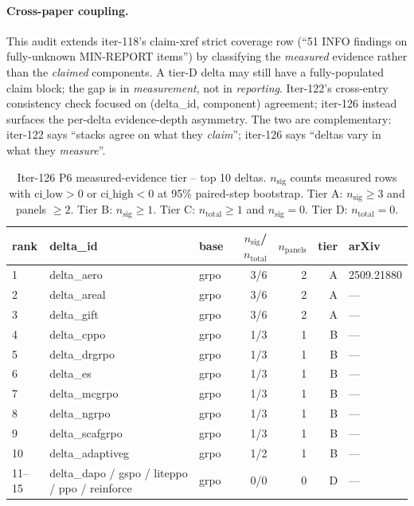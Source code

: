 \paragraph{Cross-paper coupling.}
This audit extends iter-118's claim-xref strict coverage row
(``51 INFO findings on fully-unknown MIN-REPORT items'') by classifying
the \emph{measured} evidence rather than the \emph{claimed} components.
A tier-D delta may still have a fully-populated claim block; the gap is
in \emph{measurement}, not in \emph{reporting}.  Iter-122's
cross-entry consistency check focused on (delta\_id, component)
agreement; iter-126 instead surfaces the per-delta evidence-depth
asymmetry.  The two are complementary: iter-122 says ``stacks agree on
what they \emph{claim}''; iter-126 says ``deltas vary in what they
\emph{measure}''.

\begin{table}[t]
\centering
\small
\caption{Iter-126 P6 measured-evidence tier -- top 10 deltas.  $n_{\text{sig}}$ counts
measured rows with $\text{ci\_low} > 0$ or $\text{ci\_high} < 0$ at 95\% paired-step bootstrap.
Tier A: $n_{\text{sig}} \geq 3$ and panels $\geq 2$.  Tier B: $n_{\text{sig}} \geq 1$.
Tier C: $n_{\text{total}} \geq 1$ and $n_{\text{sig}} = 0$.  Tier D: $n_{\text{total}} = 0$.}
\label{tab:p6-iter126-tier-rk}
\begin{tabular}{lllrrrl}
\toprule
rank & delta\_id & base & $n_{\text{sig}}$/$n_{\text{total}}$ & $n_{\text{panels}}$ & tier & arXiv \\
\midrule
1 & delta\_aero     & grpo & 3/6 & 2 & A & 2509.21880 \\
2 & delta\_areal    & grpo & 3/6 & 2 & A & --- \\
3 & delta\_gift     & grpo & 3/6 & 2 & A & --- \\
4 & delta\_cppo     & grpo & 1/3 & 1 & B & --- \\
5 & delta\_drgrpo   & grpo & 1/3 & 1 & B & --- \\
6 & delta\_es       & grpo & 1/3 & 1 & B & --- \\
7 & delta\_mcgrpo   & grpo & 1/3 & 1 & B & --- \\
8 & delta\_ngrpo    & grpo & 1/3 & 1 & B & --- \\
9 & delta\_scafgrpo & grpo & 1/3 & 1 & B & --- \\
10 & delta\_adaptiveg & grpo & 1/2 & 1 & B & --- \\
\midrule
11--15 & delta\_dapo / gspo / liteppo / ppo / reinforce & grpo & 0/0 & 0 & D & --- \\
\bottomrule
\end{tabular}
\end{table}
